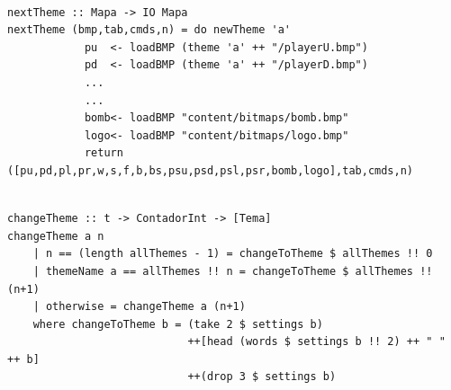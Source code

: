 \documentclass[12pt,a4paper]{report}
\begin{document}
\begin{verbatim}

nextTheme :: Mapa -> IO Mapa
nextTheme (bmp,tab,cmds,n) = do newTheme 'a'
            pu  <- loadBMP (theme 'a' ++ "/playerU.bmp")
            pd  <- loadBMP (theme 'a' ++ "/playerD.bmp")
            ...
            ...
            bomb<- loadBMP "content/bitmaps/bomb.bmp"
            logo<- loadBMP "content/bitmaps/logo.bmp"
            return ([pu,pd,pl,pr,w,s,f,b,bs,psu,psd,psl,psr,bomb,logo],tab,cmds,n)

\end{verbatim}

\newpage

\begin{verbatim}

changeTheme :: t -> ContadorInt -> [Tema]
changeTheme a n
    | n == (length allThemes - 1) = changeToTheme $ allThemes !! 0
    | themeName a == allThemes !! n = changeToTheme $ allThemes !! (n+1)
    | otherwise = changeTheme a (n+1)
    where changeToTheme b = (take 2 $ settings b)
                            ++[head (words $ settings b !! 2) ++ " " ++ b]
                            ++(drop 3 $ settings b)
\end{verbatim}

\hfill

\hfill
\end{document}
